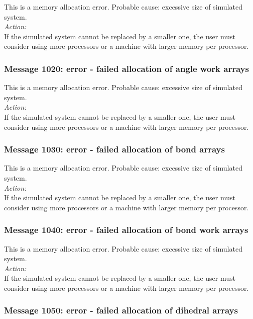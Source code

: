 This is a memory allocation error. Probable cause: excessive size of
simulated system. \\

\noindent
{\em Action:}\\
If the simulated system cannot be replaced by a smaller one, the user
must consider using more processors or a machine with larger memory
per processor.

\subsubsection*{Message 1020: error - failed allocation of angle work
arrays}

This is a memory allocation error. Probable cause: excessive size of
simulated system. \\

\noindent
{\em Action:}\\
If the simulated system cannot be replaced by a smaller one, the user
must consider using more processors or a machine with larger memory
per processor.

\subsubsection*{Message 1030: error - failed allocation of bond arrays}

This is a memory allocation error. Probable cause: excessive size of
simulated system. \\

\noindent
{\em Action:}\\
If the simulated system cannot be replaced by a smaller one, the user
must consider using more processors or a machine with larger memory
per processor.

\subsubsection*{Message 1040: error - failed allocation of bond work
arrays}

This is a memory allocation error. Probable cause: excessive size of
simulated system. \\

\noindent
{\em Action:}\\
If the simulated system cannot be replaced by a smaller one, the user
must consider using more processors or a machine with larger memory
per processor.

\subsubsection*{Message 1050: error - failed allocation of dihedral
arrays}

